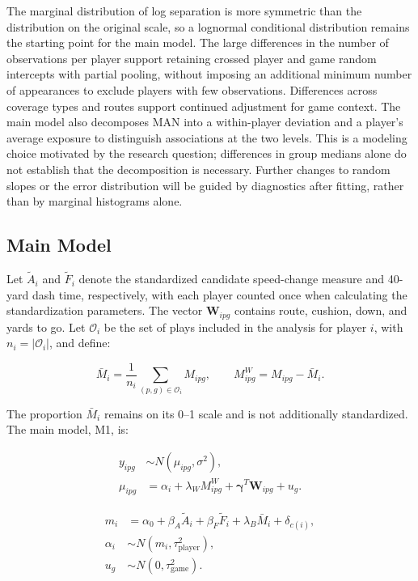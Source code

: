 \documentclass[a4paper,11pt]{article}
\begin{document}
The marginal distribution of log separation is more symmetric than the distribution on the original scale, so a lognormal conditional distribution remains the starting point for the main model. The large differences in the number of observations per player support retaining crossed player and game random intercepts with partial pooling, without imposing an additional minimum number of appearances to exclude players with few observations. Differences across coverage types and routes support continued adjustment for game context. The main model also decomposes MAN into a within-player deviation and a player's average exposure to distinguish associations at the two levels. This is a modeling choice motivated by the research question; differences in group medians alone do not establish that the decomposition is necessary. Further changes to random slopes or the error distribution will be guided by diagnostics after fitting, rather than by marginal histograms alone.

\subsection{Main Model}

Let $\widetilde A_i$ and $\widetilde F_i$ denote the standardized candidate speed-change measure and 40-yard dash time, respectively, with each player counted once when calculating the standardization parameters. The vector $\mathbf W_{ipg}$ contains route, cushion, down, and yards to go. Let $\mathcal O_i$ be the set of plays included in the analysis for player $i$, with $n_i=|\mathcal O_i|$, and define:

\begin{equation}
\bar M_i=\frac{1}{n_i}\sum_{(p,g)\in\mathcal O_i}M_{ipg},
\qquad M^W_{ipg}=M_{ipg}-\bar M_i.
\end{equation}

The proportion $\bar M_i$ remains on its 0--1 scale and is not additionally standardized. The main model, M1, is:

\begin{equation}
\begin{aligned}
y_{ipg}&\sim N(\mu_{ipg},\sigma^2), \\
\mu_{ipg}&=\alpha_i+\lambda_W M^W_{ipg}+\boldsymbol\gamma^T\mathbf W_{ipg}+u_g.
\end{aligned}
\end{equation}

\begin{equation}
\begin{aligned}
m_i&=\alpha_0+\beta_A\widetilde A_i+\beta_F\widetilde F_i
       +\lambda_B\bar M_i+\delta_{c(i)}, \\
\alpha_i&\sim N(m_i,\tau_{\mathrm{player}}^2), \\
u_g&\sim N(0,\tau_{\mathrm{game}}^2).
\end{aligned}
\end{equation}
\end{document}
